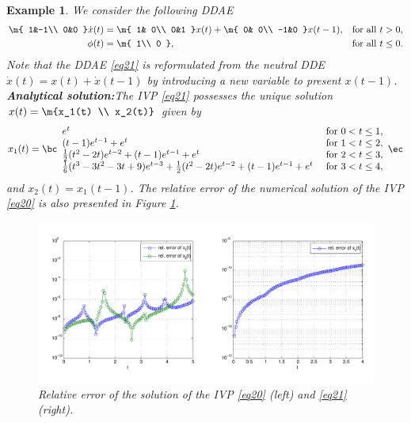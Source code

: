 \documentclass[final,reqno]{siamltex}
\newtheorem{example}[theorem]{Example}
\begin{document}
\begin{example}\label{Exa2} We consider the following DDAE
%
\begin{equation}\label{eq21}
\begin{aligned}
\m{
1&-1\\
0&0 
}
\dot{x}(t) &=
\m{
1& 0\\
0&1 
}
x(t) + 
\m{
0& 0\\
-1&0
}
x(t-1), && \mbox{for all } t>0,\\
\phi(t) &=
\m{
1\\
0 
},
&& \mbox{for all } t \leq 0.
\end{aligned}
\end{equation}
%
Note that the DDAE \eqref{eq21} is reformulated from the neutral DDE $\dot{x}(t)=x(t)+\dot{x}(t-1)$ by introducing a new variable to present $x(t-1)$.\\
{\bf Analytical solution:}\quad The IVP \eqref{eq21} possesses the unique solution 
$x(t)= \m{x_1(t) \\ x_2(t)}$ given by
\begin{align*}
x_1(t)=
\bc
\begin{array}{ll}
e^t & \mbox{ for } 0<t\leq1, \\
(t-1)e^{t-1}+e^t & \mbox{ for } 1<t\leq2, \\
\tfrac12(t^2-2t)e^{t-2}+(t-1)e^{t-1}+e^t & \mbox{ for } 2<t\leq3,\\
\tfrac16(t^3-3t^2-3t+9)e^{t-3}+\tfrac12 (t^2-2t)e^{t-2}+(t-1)e^{t-1}+e^t & \mbox{ for } 3<t\leq4,
\end{array}
\ec
\end{align*}
and
$x_2(t)=x_1(t-1)$. The relative error of the numerical solution of the IVP \eqref{eq20} is also presented in Figure \ref{fig_Paul}.

\begin{figure}[h]
 \centering
 \includegraphics[width=\textwidth]{plot_149_214.pdf}
 \caption{Relative error of the solution of the IVP \eqref{eq20} (left) and \eqref{eq21} (right).}
 \label{fig_Paul}
\end{figure}
\end{example}
\end{document}
